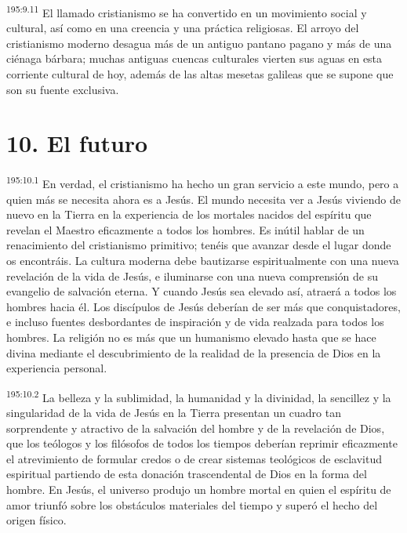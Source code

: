 \par 
\textsuperscript{195:9.11} El llamado cristianismo se ha convertido en un movimiento social y cultural, así como en una creencia y una práctica religiosas. El arroyo del cristianismo moderno desagua más de un antiguo pantano pagano y más de una ciénaga bárbara; muchas antiguas cuencas culturales vierten sus aguas en esta corriente cultural de hoy, además de las altas mesetas galileas que se supone que son su fuente exclusiva.

\section*{10. El futuro}
\par 
\textsuperscript{195:10.1} En verdad, el cristianismo ha hecho un gran servicio a este mundo, pero a quien más se necesita ahora es a Jesús. El mundo necesita ver a Jesús viviendo de nuevo en la Tierra en la experiencia de los mortales nacidos del espíritu que revelan el Maestro eficazmente a todos los hombres. Es inútil hablar de un renacimiento del cristianismo primitivo; tenéis que avanzar desde el lugar donde os encontráis. La cultura moderna debe bautizarse espiritualmente con una nueva revelación de la vida de Jesús, e iluminarse con una nueva comprensión de su evangelio de salvación eterna. Y cuando Jesús sea elevado así, atraerá a todos los hombres hacia él. Los discípulos de Jesús deberían de ser más que conquistadores, e incluso fuentes desbordantes de inspiración y de vida realzada para todos los hombres. La religión no es más que un humanismo elevado hasta que se hace divina mediante el descubrimiento de la realidad de la presencia de Dios en la experiencia personal.

\par 
\textsuperscript{195:10.2} La belleza y la sublimidad, la humanidad y la divinidad, la sencillez y la singularidad de la vida de Jesús en la Tierra presentan un cuadro tan sorprendente y atractivo de la salvación del hombre y de la revelación de Dios, que los teólogos y los filósofos de todos los tiempos deberían reprimir eficazmente el atrevimiento de formular credos o de crear sistemas teológicos de esclavitud espiritual partiendo de esta donación trascendental de Dios en la forma del hombre. En Jesús, el universo produjo un hombre mortal en quien el espíritu de amor triunfó sobre los obstáculos materiales del tiempo y superó el hecho del origen físico.

